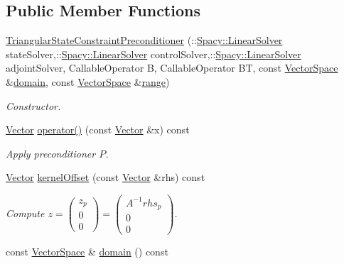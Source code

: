 \subsection*{Public Member Functions}
\begin{DoxyCompactItemize}
\item 
\hyperlink{classSpacy_1_1CG_1_1TriangularStateConstraintPreconditioner_a8bbfa8bf7bdfcd3c308d4dbec8c448d0}{Triangular\+State\+Constraint\+Preconditioner} (\+::\hyperlink{namespaceSpacy_a4cd614ddb41dd29e68a723dadd5602f2}{Spacy\+::\+Linear\+Solver} state\+Solver,\+::\hyperlink{namespaceSpacy_a4cd614ddb41dd29e68a723dadd5602f2}{Spacy\+::\+Linear\+Solver} control\+Solver,\+::\hyperlink{namespaceSpacy_a4cd614ddb41dd29e68a723dadd5602f2}{Spacy\+::\+Linear\+Solver} adjoint\+Solver, Callable\+Operator B, Callable\+Operator B\+T, const \hyperlink{classSpacy_1_1VectorSpace}{Vector\+Space} \&\hyperlink{classSpacy_1_1OperatorBase_a2588f9b3e0188820c4c494e63293dc6f}{domain}, const \hyperlink{classSpacy_1_1VectorSpace}{Vector\+Space} \&\hyperlink{classSpacy_1_1OperatorBase_ab19d3b7a6f290b1079248f1e567e53d6}{range})
\begin{DoxyCompactList}\small\item\em Constructor. \end{DoxyCompactList}\item 
\hyperlink{classSpacy_1_1Vector}{Vector} \hyperlink{classSpacy_1_1CG_1_1TriangularStateConstraintPreconditioner_acf6c7985d679599274592917fdae5cbc}{operator()} (const \hyperlink{classSpacy_1_1Vector}{Vector} \&x) const 
\begin{DoxyCompactList}\small\item\em Apply preconditioner $P$. \end{DoxyCompactList}\item 
\hyperlink{classSpacy_1_1Vector}{Vector} \hyperlink{classSpacy_1_1CG_1_1TriangularStateConstraintPreconditioner_a959f6f366b868163b6cbeda7c96bcc8e}{kernel\+Offset} (const \hyperlink{classSpacy_1_1Vector}{Vector} \&rhs) const 
\begin{DoxyCompactList}\small\item\em Compute $ z = \left( \begin{array}{c} z_p \\ 0 \\ 0 \end{array} \right) = \left( \begin{array}{c} A^{-1}rhs_p \\ 0 \\ 0 \end{array} \right) $. \end{DoxyCompactList}\item 
\hypertarget{classSpacy_1_1OperatorBase_a2588f9b3e0188820c4c494e63293dc6f}{}const \hyperlink{classSpacy_1_1VectorSpace}{Vector\+Space} \& \hyperlink{classSpacy_1_1OperatorBase_a2588f9b3e0188820c4c494e63293dc6f}{domain} () const \label{classSpacy_1_1OperatorBase_a2588f9b3e0188820c4c494e63293dc6f}


\end{DoxyCompactItemize}
